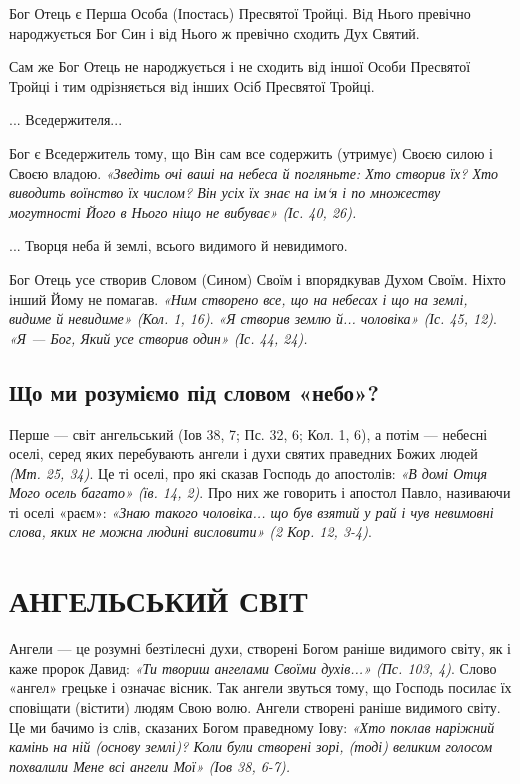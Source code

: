 \documentclass[main.tex]{subfiles}
\begin{document}
Бог Отець є Перша Особа (Іпостась) Пресвятої Тройці. Від Нього превічно народжується Бог Син і від Нього ж превічно сходить Дух Святий.

Сам же Бог Отець не народжується і не сходить від іншої Особи Пресвятої Тройці і тим одрізняється від інших Осіб Пресвятої Тройці.

... Вседержителя...

Бог є Вседержитель тому, що Він сам все содержить (утримує) Своєю силою і Своєю владою. \emph{«Зведіть очі ваші на небеса й погляньте: Хто створив їх? Хто виводить воїнство їх числом? Він усіх їх знає на ім`я і по множеству могутності Його в Нього ніщо не вибуває» (Іс. 40, 26).}

... Творця неба й землі, всього видимого й невидимого.

Бог Отець усе створив Словом (Сином) Своїм і впорядкував Духом Своїм. Ніхто інший Йому не помагав. \emph{«Ним створено все, що на небесах і що на землі, видиме й невидиме» (Кол. 1, 16)}. \emph{{\color{red} «Я створив землю й... чоловіка»} (Іс. 45, 12)}. \emph{{\color{red} «Я — Бог, Який усе створив один»} (Іс. 44, 24).}

\subsection{Що ми розуміємо під словом «небо»?}

Перше — світ ангельський (Іов 38, 7; Пс. 32, 6; Кол. 1, 6), а потім — небесні оселі, серед яких перебувають ангели і духи святих праведних Божих людей \emph{(Мт. 25, 34)}. Це ті оселі, про які сказав Господь до апостолів: \emph{{\color{red} «В домі Отця Мого осель багато»} (їв. 14, 2)}. Про них же говорить і апостол Павло, називаючи ті оселі «раєм»: \emph{«Знаю такого чоловіка... що був взятий у рай і чув невимовні слова, яких не можна людині висловити» (2 Кор. 12, 3-4)}.

\section{АНГЕЛЬСЬКИЙ СВІТ}

Ангели — це розумні безтілесні духи, створені Богом раніше видимого світу, як і каже пророк Давид: \emph{«Ти твориш ангелами Своїми духів...» (Пс. 103, 4)}. Слово «ангел» грецьке і означає вісник. Так ангели звуться тому, що Господь посилає їх сповіщати (вістити) людям Свою волю. Ангели створені раніше видимого світу. Це ми бачимо із слів, сказаних Богом праведному Іову: \emph{{\color{red} «Хто поклав наріжний камінь на ній (основу землі)? Коли були створені зорі, (тоді) великим голосом похвалили Мене всі ангели Мої»} (Іов 38, 6-7).}
\end{document}
